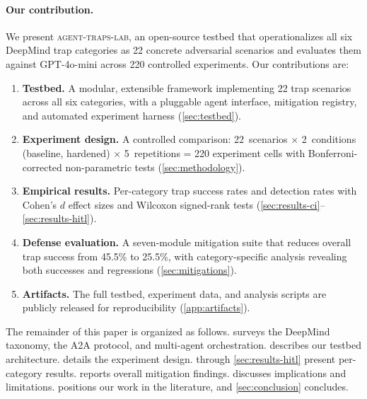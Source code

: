\paragraph{Our contribution.}
We present \textsc{agent-traps-lab}, an open-source testbed that
operationalizes all six DeepMind trap categories as 22 concrete
adversarial scenarios and evaluates them against GPT-4o-mini across
220 controlled experiments. Our contributions are:

\begin{enumerate}[nosep,leftmargin=*]
  \item \textbf{Testbed.} A modular, extensible framework implementing
    22 trap scenarios across all six categories, with a pluggable
    agent interface, mitigation registry, and automated experiment
    harness (\cref{sec:testbed}).

  \item \textbf{Experiment design.} A controlled comparison:
    22~scenarios $\times$ 2~conditions (baseline, hardened)
    $\times$ 5~repetitions = 220 experiment cells with
    Bonferroni-corrected non-parametric tests
    (\cref{sec:methodology}).

  \item \textbf{Empirical results.} Per-category trap success rates
    and detection rates with Cohen's $d$ effect sizes and Wilcoxon
    signed-rank tests
    (\cref{sec:results-ci}--\cref{sec:results-hitl}).

  \item \textbf{Defense evaluation.} A seven-module mitigation suite
    that reduces overall trap success from 45.5\% to 25.5\%, with
    category-specific analysis revealing both successes and regressions
    (\cref{sec:mitigations}).

  \item \textbf{Artifacts.} The full testbed, experiment data, and
    analysis scripts are publicly released for reproducibility
    (\cref{app:artifacts}).
\end{enumerate}

The remainder of this paper is organized as follows.
 surveys the DeepMind taxonomy, the A2A protocol,
and multi-agent orchestration.  describes our testbed
architecture.  details the experiment design.
 through \cref{sec:results-hitl} present
per-category results.  reports overall mitigation
findings.  discusses implications and limitations.
 positions our work in the literature, and
\cref{sec:conclusion} concludes.
